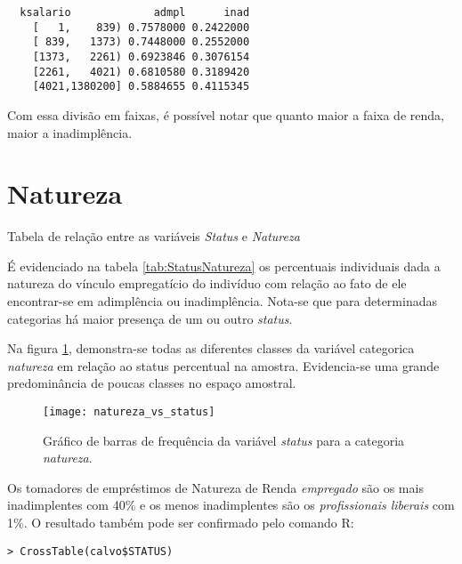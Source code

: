 \begin{lstlisting}
  ksalario             admpl      inad
    [   1,    839) 0.7578000 0.2422000
    [ 839,   1373) 0.7448000 0.2552000
    [1373,   2261) 0.6923846 0.3076154
    [2261,   4021) 0.6810580 0.3189420
    [4021,1380200] 0.5884655 0.4115345
\end{lstlisting}


Com essa divisão em faixas, é possível notar que quanto maior a faixa
de renda, maior a inadimplência.


\section{Natureza}

\begin{table}[h]
\centering

\caption{\label{tab:StatusNatureza}Tabela de relação entre as variáveis \emph{Status
}e \emph{Natureza}}
\end{table}

É evidenciado na tabela \ref{tab:StatusNatureza} os percentuais individuais dada a natureza do vínculo empregatício
do indivíduo com relação ao fato de ele encontrar-se em adimplência ou inadimplência. Nota-se que para determinadas categorias 
há maior presença de um ou outro \emph{status}. 

Na figura \ref{fig:FreqStatusVsNatureza}, demonstra-se todas as diferentes classes da variável categorica \emph{natureza} em relação ao status percentual na amostra. Evidencia-se uma grande predominância de poucas classes no espaço amostral.

\begin{center}
\begin{figure}
\begin{centering}
\texttt{[image: natureza\_vs\_status]}
\par\end{centering}

\caption{\label{fig:FreqStatusVsNatureza}Gráfico de barras de frequência da
  variável \emph{status} para a categoria \emph{natureza}.}
\end{figure}

\par\end{center}

Os tomadores de empréstimos de Natureza de Renda \emph{empregado} são os
mais inadimplentes com 40\% e os menos inadimplentes são os \emph{profissionais
liberais} com 1\%. O resultado também pode ser confirmado pelo comando
R:

\begin{verbatim}
> CrossTable(calvo$STATUS)
\end{verbatim}
